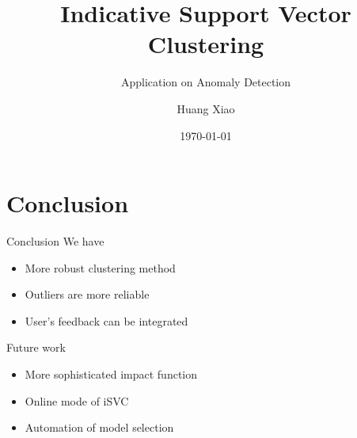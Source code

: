 \documentclass[10pt]{beamer}
\begin{document}
\title{Indicative Support Vector Clustering}
\subtitle{Application on Anomaly Detection}
\author{Huang Xiao} %

\date{\today}
\maketitle







\section{Conclusion}
\begin{frame}{Conclusion}
We have
\begin{itemize}
\item More robust clustering method
\item Outliers are more reliable
\item User's feedback can be integrated
\end{itemize}
Future work
\begin{itemize}
\item More sophisticated impact function
\item Online mode of iSVC
\item Automation of model selection
\end{itemize}
\end{frame}
\end{document}

